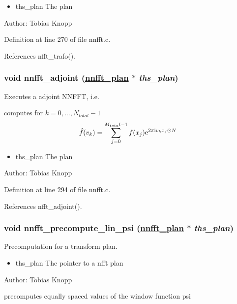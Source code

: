 \begin{itemize}
\item ths\_\-plan The plan\end{itemize}
\begin{Desc}
\item[Author:]Tobias Knopp \end{Desc}


Definition at line 270 of file nnfft.c.

References nfft\_\-trafo().\hypertarget{group__nnfft_ga5}{
\subsubsection[nnfft\_\-adjoint]{\setlength{\rightskip}{0pt plus 5cm}void nnfft\_\-adjoint (\hyperlink{structnnfft__plan}{nnfft\_\-plan} $\ast$ {\em ths\_\-plan})}}
\label{group__nnfft_ga5}


Executes a adjoint NNFFT, i.e. 

computes for $k=0,...,N_{total}-1$ \[ \hat{f}(v_k) = \sum_{j = 0}^{M_{tota}l-1} f(x_j) {\rm e}^{2 \pi \mbox{\rm\scriptsize i} v_k x_j \odot N} \]

\begin{itemize}
\item ths\_\-plan The plan\end{itemize}
\begin{Desc}
\item[Author:]Tobias Knopp \end{Desc}


Definition at line 294 of file nnfft.c.

References nfft\_\-adjoint().\hypertarget{group__nnfft_ga6}{
\subsubsection[nnfft\_\-precompute\_\-lin\_\-psi]{\setlength{\rightskip}{0pt plus 5cm}void nnfft\_\-precompute\_\-lin\_\-psi (\hyperlink{structnnfft__plan}{nnfft\_\-plan} $\ast$ {\em ths\_\-plan})}}
\label{group__nnfft_ga6}


Precomputation for a transform plan. 

\begin{itemize}
\item ths\_\-plan The pointer to a nfft plan\end{itemize}
\begin{Desc}
\item[Author:]Tobias Knopp\end{Desc}
precomputes equally spaced values of the window function psi

